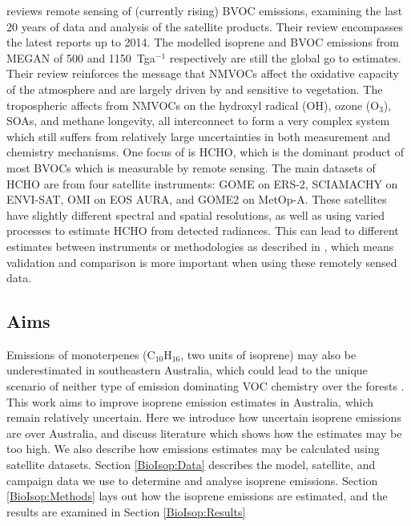   \textcite{Kefauver2014} reviews remote sensing of (currently rising) BVOC emissions, examining the last 20 years of data and analysis of the satellite products.
  Their review encompasses the latest reports up to 2014.
  The modelled isoprene and BVOC emissions from MEGAN \parencite{Guenther2000} of 500 and 1150~Tga$^{-1}$ respectively are still the global go to estimates.
  Their review reinforces the message that NMVOCs affect the oxidative capacity of the atmosphere and are largely driven by and sensitive to vegetation.
  The tropospheric affects from NMVOCs on the hydroxyl radical (OH), ozone (O$_3$), SOAs, and methane longevity, all interconnect to form a very complex system which still suffers from relatively large uncertainties in both measurement and chemistry mechanisms.
  One focus of \textcite{Kefauver2014} is HCHO, which is the dominant product of most BVOCs which is measurable by remote sensing.
  The main datasets of HCHO are from four satellite instruments: GOME on ERS-2, SCIAMACHY on ENVI-SAT, OMI on EOS AURA, and GOME2 on MetOp-A.
  These satellites have slightly different spectral and spatial resolutions, as well as using varied processes to estimate HCHO from detected radiances.
  This can lead to different estimates between instruments or methodologies as described in \textcite{Lorent2017}, which means validation and comparison is more important when using these remotely sensed data.
  
  \subsection{Aims}
    
    Emissions of monoterpenes (C$_10$H$_16$, two units of isoprene) may also be underestimated in southeastern Australia, which could lead to the unique scenario of neither type of emission dominating VOC chemistry over the forests \parencite{Emmerson2016}.
    This work aims to improve isoprene emission estimates in Australia, which remain relatively uncertain.
    Here we introduce how uncertain isoprene emissions are over Australia, and discuss literature which shows how the estimates may be too high.
    We also describe how emissions estimates may be calculated using satellite datasets.
    Section \ref{BioIsop:Data} describes the model, satellite, and campaign data we use to determine and analyse isoprene emissions.
    Section \ref{BioIsop:Methods} lays out how the isoprene emissions are estimated, and the results are examined in Section \ref{BioIsop:Results}
  
